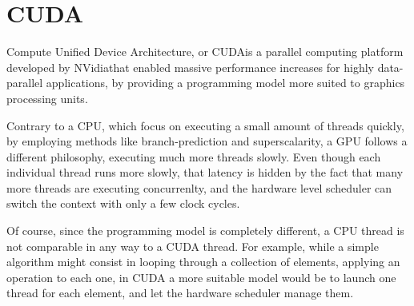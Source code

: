 \section{CUDA}
\label{sec:cuda}


Compute Unified Device Architecture, or CUDA\tm is a parallel computing platform developed by NVidia\tr that enabled massive performance increases for highly data-parallel applications, by providing a programming model more suited to graphics processing units.

Contrary to a CPU, which focus on executing a small amount of threads quickly, by employing methods like branch-prediction and superscalarity, a GPU follows a different philosophy, executing much more threads slowly. Even though each individual thread runs more slowly, that latency is hidden by the fact that many more threads are executing concurrenlty, and the hardware level scheduler can switch the context with only a few clock cycles.

Of course, since the programming model is completely different, a CPU thread is not comparable in any way to a CUDA thread. For example, while a simple algorithm might consist in looping through a collection of elements, applying an operation to each one, in CUDA a more suitable model would be to launch one thread for each element, and let the hardware scheduler manage them.




